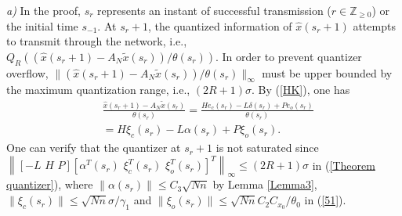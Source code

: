 \documentclass[letterpaper,journal,final,twocolumn]{IEEEtran}
\begin{document}
\emph{a)} In the proof, $s_r$ represents an instant of successful transmission ($r \in \mathbb Z _{\ge0}$) or the initial time $s_{-1}$. At $s_r + 1$, the quantized information of $\hat x(s_r + 1)$ attempts to transmit through the network, i.e., 
$
Q_R\left( (\hat  x(s_r + 1) - A_N \tilde  x(s_r)  )       /\theta (s_r) \right). 
$
In order to prevent quantizer overflow, $\| (\hat x(s_r + 1) - A_N \tilde x(s_r)  )/\theta (s_r) \|_\infty $ must be upper bounded by the maximum quantization range, i.e., $(2R+1)\sigma$. By (\ref{HK}), one has
\begin{align}
&\frac{\hat x(s_r + 1) - A_N \tilde x(s_r)}{\theta (s_r)}= \frac{He_c(s_r) - L \delta(s_r) + P e_o(s_r)  }{\theta(s_r)} \nonumber\\
&= H \xi_c (s_r) - L \alpha(s_r) + P \xi_o(s_r). 
\end{align}  
One can verify that the quantizer at $s_r + 1$ is not saturated since 
$
\left\| [-L\,\, H\,\, P]   
[
\alpha^T(s_r)\,\, 
\xi_c ^T (s_r)\,\, \xi_o^T(s_r)
]^T
\right\|_\infty 
\le (2R + 1) \sigma
$ in (\ref{Theorem quantizer}), where
$\|\alpha(s_r)\| \le C_3 \sqrt{Nn}$ by Lemma \ref{Lemma3}, $\|\xi_c(s_r)\|\le \sqrt{Nn} \sigma /\gamma_1$ and $\|\xi_o(s_r)\| \le \sqrt{Nn} C_2 C_{x_0} /\theta_0$ in (\ref{51}). 
\end{document}
